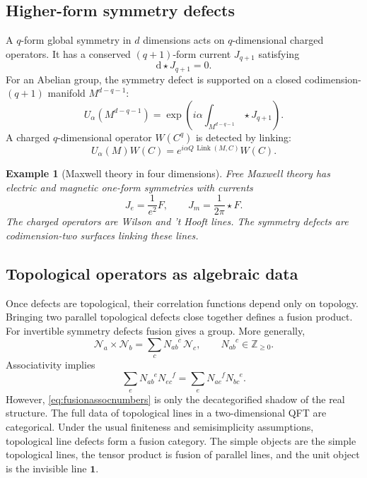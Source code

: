 \documentclass[11pt]{article}
\newtheorem{example}[theorem]{Example}
\newcommand{\Z}{\mathbb{Z}}
\newcommand{\dd}{\mathrm{d}}
\newcommand{\cN}{\mathcal{N}}
\newcommand{\id}{\mathbf{1}}
\begin{document}
\subsection{Higher-form symmetry defects}

A $q$-form global symmetry in $d$ dimensions acts on $q$-dimensional charged operators.  It has a conserved $(q+1)$-form current $J_{q+1}$ satisfying
\begin{equation}
  \dd \star J_{q+1}=0 .
\end{equation}
For an Abelian group, the symmetry defect is supported on a closed codimension-$(q+1)$ manifold $M^{d-q-1}$:
\begin{equation}
  U_\alpha(M^{d-q-1})=\exp\left(i\alpha\int_{M^{d-q-1}}\star J_{q+1}\right) .
\end{equation}
A charged $q$-dimensional operator $W(C^q)$ is detected by linking:
\begin{equation}
  U_\alpha(M) W(C)=e^{i\alpha Q\,\operatorname{Link}(M,C)} W(C) .
\end{equation}

\begin{example}[Maxwell theory in four dimensions]
Free Maxwell theory has electric and magnetic one-form symmetries with currents
\begin{equation}
  J_e=\frac{1}{e^2}F,\qquad J_m=\frac{1}{2\pi}\star F .
\end{equation}
The charged operators are Wilson and 't Hooft lines.  The symmetry defects are codimension-two surfaces linking these lines.
\end{example}



\subsection{Topological operators as algebraic data}

Once defects are topological, their correlation functions depend only on topology.  Bringing two parallel topological defects close together defines a fusion product.  For invertible symmetry defects fusion gives a group.  More generally,
\begin{equation}
  \cN_a\times \cN_b=\sum_c N_{ab}^{\phantom{ab}c}\,\cN_c,
  \qquad N_{ab}^{\phantom{ab}c}\in\Z_{\ge 0} .
  \label{eq:fusionring}
\end{equation}
Associativity implies
\begin{equation}
  \sum_e N_{ab}^{\phantom{ab}e}N_{ec}^{\phantom{ec}f}
  =\sum_e N_{ae}^{\phantom{ae}f}N_{bc}^{\phantom{bc}e} .
  \label{eq:fusionassocnumbers}
\end{equation}
However, \eqref{eq:fusionassocnumbers} is only the decategorified shadow of the real structure.  The full data of topological lines in a two-dimensional QFT are categorical.  Under the usual finiteness and semisimplicity assumptions, topological line defects form a fusion category.  The simple objects are the simple topological lines, the tensor product is fusion of parallel lines, and the unit object is the invisible line $\id$.
\end{document}
